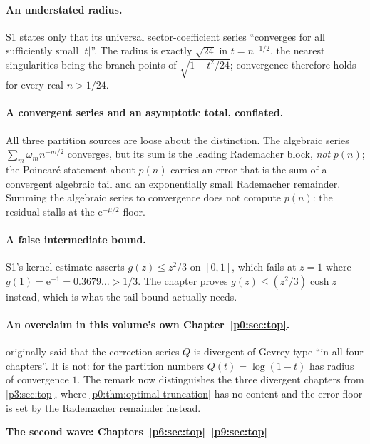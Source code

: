 \documentclass[11pt,a4paper,oneside]{book}
\theoremstyle{plain}
\theoremstyle{definition}
\theoremstyle{remark}
\newcommand{\e}{\mathrm{e}}
\begin{document}
\paragraph{An understated radius.}
\textsf{S1} states only that its universal sector-coefficient series
``converges for all sufficiently small \(\lvert t\rvert\)''.  The radius is
exactly \(\sqrt{24}\) in \(t=n^{-1/2}\), the nearest singularities being the
branch points of \(\sqrt{1-t^2/24}\); convergence therefore holds for every
real \(n>1/24\).

\paragraph{A convergent series and an asymptotic total, conflated.}
All three partition sources are loose about the distinction.  The algebraic
series \(\sum_m\omega_mn^{-m/2}\) converges, but its sum is the leading
Rademacher block, \emph{not} \(p(n)\); the Poincaré statement about \(p(n)\)
carries an error that is the sum of a convergent algebraic tail and an
exponentially small Rademacher remainder.  Summing the algebraic series to
convergence does not compute \(p(n)\): the residual stalls at the
\(\e^{-\mu/2}\) floor.

\paragraph{A false intermediate bound.}
\textsf{S1}'s kernel estimate asserts \(g(z)\le z^2/3\) on \([0,1]\), which
fails at \(z=1\) where \(g(1)=\e^{-1}=0.3679\ldots>1/3\).  The chapter proves
\(g(z)\le(z^2/3)\cosh z\) instead, which is what the tail bound actually
needs.

\paragraph{An overclaim in this volume's own Chapter~\ref{p0:sec:top}.}
 originally said that the correction series \(Q\)
is divergent of Gevrey type ``in all four chapters''.  It is not: for the
partition numbers \(Q(t)=\log(1-t)\) has radius of convergence \(1\).  The
remark now distinguishes the three divergent chapters from
\cref{p3:sec:top}, where \cref{p0:thm:optimal-truncation} has no content and
the error floor is set by the Rademacher remainder instead.

\bigskip
\noindent\textbf{\large The second wave: Chapters~\ref{p6:sec:top}--\ref{p9:sec:top}}
\medskip
\end{document}
